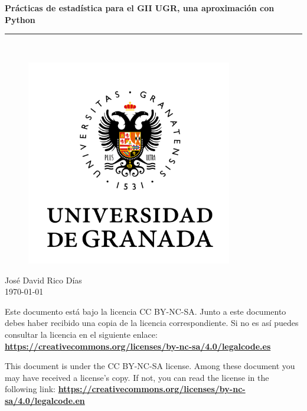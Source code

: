 \documentclass[openany,a4paper]{book}
\begin{document}
 
\begin{titlepage}
	\begin{center}		
		\vspace*{1.0cm}
		\begin{Huge}
			\textbf{Prácticas de estadística para el GII UGR, una aproximación con Python}\\
		\end{Huge}	
		\vspace*{1.0cm}
		\rule{150mm}{0.1mm}\\
		
		\vspace*{1.5cm}
		\begin{figure}[htb]
			\begin{center}
				\includegraphics[width=9cm]{images/logotypes/Logo UGR.png}
			\end{center}
		\end{figure}
        \huge{José David Rico Días}\\
		\vspace*{1cm}
	    \Large{\today}
	\end{center}		
\end{titlepage}

\thispagestyle{empty}

Este documento está bajo la licencia CC BY-NC-SA. Junto a este documento debes haber recibido una copia de la licencia correspondiente. Si no es así puedes consultar la licencia en el siguiente enlace: \textbf{\href{https://creativecommons.org/licenses/by-nc-sa/4.0/legalcode.es}{https://creativecommons.org/licenses/by-nc-sa/4.0/legalcode.es}}

This document is under the CC BY-NC-SA license. Among these document you may have received a license's copy. If not, you can read the license in the following link: \textbf{\href{https://creativecommons.org/licenses/by-nc-sa/4.0/legalcode.en}{https://creativecommons.org/licenses/by-nc-sa/4.0/legalcode.en}}
\end{document}
